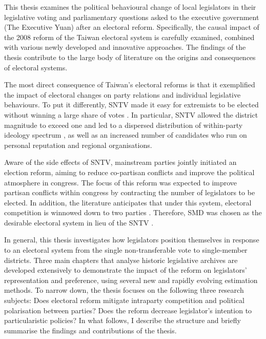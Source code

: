 This thesis examines the political behavioural change of local legislators in their legislative voting and parliamentary questions asked to the executive government (The Executive Yuan) after an electoral reform. Specifically, the causal impact of the 2008 reform of the Taiwan electoral system is carefully examined, combined with various newly developed and innovative approaches. The findings of the thesis contribute to the large body of literature on the origins and consequences of electoral systems.

The most direct consequence of Taiwan's electoral reforms is that it exemplified the impact of electoral changes on party relations and individual legislative behaviours. To put it differently, SNTV made it easy for extremists to be elected without winning a large share of votes  \citep[e.g.,][]{Cox1987, Cox1990, Cox1996, Cox2008, Carey1995}. In particular, SNTV allowed the district magnitude to exceed one and led to a dispersed distribution of within-party ideology spectrum \citep[e.g.,][]{Stockton2010, Carey1995, Catalinac2019, Catalinac2017, Catalinac2016}, as well as an increased number of candidates who run on personal reputation and regional organisations. 

Aware of the side effects of SNTV, mainstream parties jointly initiated an election reform, aiming to reduce co-partisan conflicts and improve the political atmosphere in congress. The focus of this reform was expected to improve partisan conflicts within congress by contracting the number of legislators to be elected. In addition, the literature anticipates that under this system, electoral competition is winnowed down to two parties \citep[e.g.,][]{Catalinac2017, Downs1957, Duverger1954, Merrill2002, Magar1998, Reed2001}. Therefore, SMD was chosen as the desirable electoral system in lieu of the SNTV \citep[e.g.,][]{Yu2008, Liao2013, Jou2009}.

In general, this thesis investigates how legislators position themselves in response to an electoral system from the single non-transferable vote to single-member districts. Three main chapters that analyse historic legislative archives are developed extensively to demonstrate the impact of the reform on legislators' representation and preference, using several new and rapidly evolving estimation methods. To narrow down, the thesis focuses on the following three research subjects: Does electoral reform mitigate intraparty competition and political polarisation between parties? Does the reform decrease legislator's intention to particularistic policies? In what follows, I describe the structure and briefly summarise the findings and contributions of the thesis.

